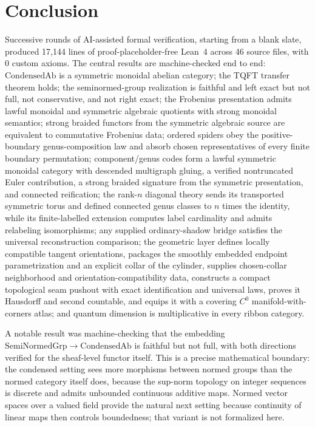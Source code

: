 \documentclass[11pt]{amsart}
\theoremstyle{plain}
\theoremstyle{definition}
\newcommand{\CondAb}{\mathrm{CondensedAb}}
\newcommand{\SemiNormedGrp}{\mathrm{SemiNormedGrp}}
\begin{document}
\section{Conclusion}
\label{sec:conclusion}

Successive rounds of AI-assisted formal verification, starting from a blank slate, produced 17,144 lines of proof-placeholder-free Lean~4 across 46 source files, with 0 custom axioms. The central results are machine-checked end to end: $\CondAb$ is a symmetric monoidal abelian category; the TQFT transfer theorem holds; the seminormed-group realization is faithful and left exact but not full, not conservative, and not right exact; the Frobenius presentation admits lawful monoidal and symmetric algebraic quotients with strong monoidal semantics; strong braided functors from the symmetric algebraic source are equivalent to commutative Frobenius data; ordered spiders obey the positive-boundary genus-composition law and absorb chosen representatives of every finite boundary permutation; component/genus codes form a lawful symmetric monoidal category with descended multigraph gluing, a verified nontruncated Euler contribution, a strong braided signature from the symmetric presentation, and connected reification; the rank-$n$ diagonal theory sends its transported symmetric torus and defined connected genus classes to $n$ times the identity, while its finite-labelled extension computes label cardinality and admits relabeling isomorphisms; any supplied ordinary-shadow bridge satisfies the universal reconstruction comparison; the geometric layer defines locally compatible tangent orientations, packages the smoothly embedded endpoint parametrization and an explicit collar of the cylinder, supplies chosen-collar neighborhood and orientation-compatibility data, constructs a compact topological seam pushout with exact identification and universal laws, proves it Hausdorff and second countable, and equips it with a covering $C^0$ manifold-with-corners atlas; and quantum dimension is multiplicative in every ribbon category.

A notable result was machine-checking that the embedding $\SemiNormedGrp \to \CondAb$ is faithful but not full, with both directions verified for the sheaf-level functor itself. This is a precise mathematical boundary: the condensed setting sees more morphisms between normed groups than the normed category itself does, because the sup-norm topology on integer sequences is discrete and admits unbounded continuous additive maps. Normed vector spaces over a valued field provide the natural next setting because continuity of linear maps then controls boundedness; that variant is not formalized here.
\end{document}
